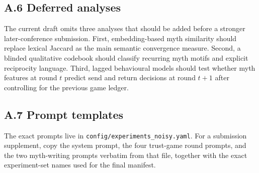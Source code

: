 \documentclass[
  10pt,
  letterpaper,
]{article}
\begin{document}
\subsection{A.6 Deferred analyses}\label{a.6-deferred-analyses}

The current draft omits three analyses that should be added before a
stronger later-conference submission. First, embedding-based myth
similarity should replace lexical Jaccard as the main semantic
convergence measure. Second, a blinded qualitative codebook should
classify recurring myth motifs and explicit reciprocity language. Third,
lagged behavioural models should test whether myth features at round
\(t\) predict send and return decisions at round \(t+1\) after
controlling for the previous game ledger.

\subsection{A.7 Prompt templates}\label{a.7-prompt-templates}

The exact prompts live in \texttt{config/experiments\_noisy.yaml}. For a
submission supplement, copy the system prompt, the four trust-game round
prompts, and the two myth-writing prompts verbatim from that file,
together with the exact experiment-set names used for the final
manifest.
\end{document}
